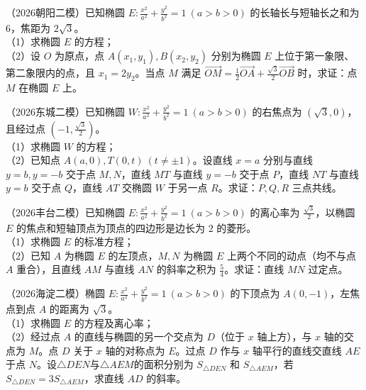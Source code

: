 \begin{example} %
（2026朝阳二模）已知椭圆 $E:\frac{x^2}{a^2}+\frac{y^2}{b^2}=1\ (a>b>0)$ 的长轴长与短轴长之和为 $6$，焦距为 $2\sqrt{3}$。\\
（1）求椭圆 $E$ 的方程；\\
（2）设 $O$ 为原点，点 $A(x_1,y_1),B(x_2,y_2)$ 分别为椭圆 $E$ 上位于第一象限、第二象限内的点，且 $x_1=2y_2$。当点 $M$ 满足 $\overrightarrow{OM}=\frac{1}{2}\overrightarrow{OA}+\frac{\sqrt{3}}{2}\overrightarrow{OB}$ 时，求证：点 $M$ 在椭圆 $E$ 上。
\end{example}

\begin{example} %
（2026东城二模）已知椭圆 $W:\frac{x^2}{a^2}+\frac{y^2}{b^2}=1\ (a>b>0)$ 的右焦点为 $(\sqrt{3},0)$，且经过点 $\left(-1,\frac{\sqrt{3}}{2}\right)$。\\
（1）求椭圆 $W$ 的方程；\\
（2）已知点 $A(a,0),T(0,t)\ (t\neq\pm1)$。设直线 $x=a$ 分别与直线 $y=b,y=-b$ 交于点 $M,N$，直线 $MT$ 与直线 $y=-b$ 交于点 $P$，直线 $NT$ 与直线 $y=b$ 交于点 $Q$，直线 $AT$ 交椭圆 $W$ 于另一点 $R$。求证：$P,Q,R$ 三点共线。
\end{example}

\begin{example} %
（2026丰台二模）已知椭圆 $E:\frac{x^2}{a^2}+\frac{y^2}{b^2}=1\ (a>b>0)$ 的离心率为 $\frac{\sqrt{3}}{2}$，以椭圆 $E$ 的焦点和短轴顶点为顶点的四边形是边长为 $2$ 的菱形。\\
（1）求椭圆 $E$ 的标准方程；\\
（2）已知 $A$ 为椭圆 $E$ 的左顶点，$M,N$ 为椭圆 $E$ 上两个不同的动点（均不与点 $A$ 重合），且直线 $AM$ 与直线 $AN$ 的斜率之积为 $\frac{5}{4}$。求证：直线 $MN$ 过定点。
\end{example}

\begin{example} %
（2026海淀二模）椭圆 $E:\frac{x^2}{a^2}+\frac{y^2}{b^2}=1\ (a>b>0)$ 的下顶点为 $A(0,-1)$，左焦点到点 $A$ 的距离为 $\sqrt{3}$。\\
（1）求椭圆 $E$ 的方程及离心率；\\
（2）经过点 $A$ 的直线与椭圆的另一个交点为 $D$（位于 $x$ 轴上方），与 $x$ 轴的交点为 $M$。点 $D$ 关于 $x$ 轴的对称点为 $E$。过点 $D$ 作与 $x$ 轴平行的直线交直线 $AE$ 于点 $N$。设$\triangle DEN$与$\triangle AEM$的面积分别为 $S_{\triangle DEN}$ 和 $S_{\triangle AEM}$，若 $S_{\triangle DEN}=3S_{\triangle AEM}$，求直线 $AD$ 的斜率。
\end{example}

